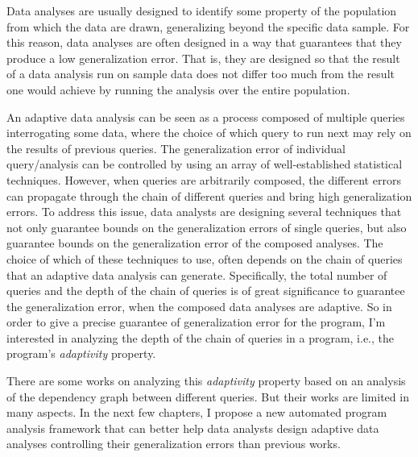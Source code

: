 
Data analyses are usually designed to identify some property of the population 
from which the data are drawn, generalizing beyond the specific data sample. 
For this reason, data analyses are often designed in a way that guarantees that they produce a low generalization error.
That is, they are designed so that the result of a data analysis run on sample data does not differ too much from the result one would achieve by running the analysis over the entire population. 

An adaptive data analysis can be seen as a process composed of multiple queries interrogating some data, where the choice of which query to run next may rely on the results of previous queries. 
The generalization error of individual query/analysis can be controlled by using an array of well-established statistical techniques.
However, when queries are arbitrarily composed, the different errors can propagate through the chain of different queries and bring high generalization errors. 
To address this issue, data analysts are designing several techniques that not only guarantee bounds on the generalization errors of single queries, but also guarantee bounds on the generalization error of the composed analyses. 
The choice of which of these techniques to use, 
often depends on the chain of queries that an adaptive data analysis can generate.
Specifically, the total number of queries and the depth of the chain of queries is of great significance 
to guarantee the generalization error, 
when the composed data analyses are adaptive. 
So in order to give a precise guarantee of generalization error
for the program,
I'm interested in analyzing the depth of the chain of queries in a program, i.e., the program's \emph{adaptivity} property.

There are some works on analyzing this \emph{adaptivity} property based on an analysis of the dependency graph between different queries.
But their works are limited in many aspects.
In the next few chapters,
I propose a new automated program analysis framework that can better help data analysts
design adaptive data analyses controlling their generalization errors than previous works.


